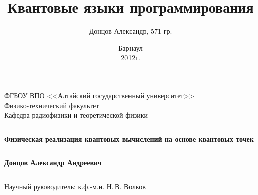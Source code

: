 \documentclass{beamer}
\begin{document}
\title{Квантовые языки программирования}  
\author[Донцов А.]{Донцов Александр, 571 гр.}


\date{
   Барнаул\\
    2012г.
}
\begin{frame}
\begin{block}{}
\begin{center}
ФГБОУ ВПО <<Алтайский государственный университет>>\\
Физико-технический факультет\\
Кафедра радиофизики и теоретической физики
\end{center}
\end{block}
  \begin{columns}
      \begin{block}{}
	\begin{flushleft}
	  {{\Large \bf Физическая реализация квантовых вычислений на основе квантовых точек\\}}
	\end{flushleft}
      \end{block}
  \end{columns}
\begin{center}
\textbf{Донцов Александр Андреевич}
\end{center}
  \begin{columns}
      \begin{flushright}
      \end{flushright}
  \end{columns}

  \begin{columns}
      \begin{flushright}
	Научный руководитель: к.ф.-м.н. Н.\,В. Волков\\
      \end{flushright}
  \end{columns}
\end{frame}
\end{document}
